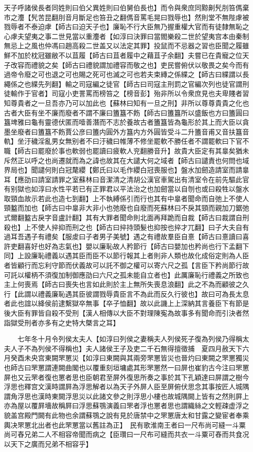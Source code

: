 天子呼諸侯長者同姓則曰伯父異姓則曰伯舅伯長也】而令與衆庶同黥劓髠刖笞傌棄市之灋【髠苦昆翻刖音月斷足也笞丑之翻傌音罵毛晃曰戮辱也】然則堂不無陛虖被戮辱者不泰迫虖【師古曰迫天子也】廉恥不行大臣無乃握重權大官而有徒隸無恥之心虖夫望夷之事二世見當以重灋者【如淳曰決罪曰當閻樂殺二世於望夷宫本由秦制無忌上之風也仲馮曰趙高殺二世盖又以法定其罪】投鼠而不忌器之習也臣聞之履雖鮮不加於枕冠雖敝不以苴履【師古曰苴者履中之藉苴子余翻】夫嘗已在貴寵之位天子改容而禮貌之矣【師古曰禮貌謂加禮容而敬之也】吏民嘗俯伏以敬畏之矣今而有過帝令廢之可也退之可也賜之死可也滅之可也若夫束縳之係緤之【師古曰緤謂以長繩係之也緤先列翻】輸之司寇編之徒官【師古曰司寇主刑罰之官編次列也徒官謂刑徒輸作于官者】司寇小吏詈罵而榜笞之【榜音彭】殆非所以令衆庶見也夫卑賤者習知尊貴者之一旦吾亦乃可以加此也【蘇林曰知有一旦之刑】非所以尊尊貴貴之化也古者大臣有坐不廉而廢者不謂不廉曰簠簋不飭【師古曰簠簋所以盛飯也方曰簠圓曰簋埤雅曰龜有靈德伏匿而噎善潛而不志於養故古者簠簋皆為龜形於其上而大臣以貪墨坐廢者曰簠簋不飭賈公彦曰簠内圓外方簋内方外圓皆受斗二升簠音甫又音扶簋音軌】坐汙穢淫亂男女無别者不曰汙穢曰帷薄不修坐罷軟不勝任者不謂罷軟曰下官不職【師古曰罷廢於事也軟弱也罷讀曰疲軟人兖翻勝音升】故貴大臣定有其辠矣猶未斥然正以呼之也尚遷就而為之諱也故其在大譴大何之域者【師古曰譴責也何問也域界局也】聞譴何則白冠氂纓【鄭氏曰以毛作纓白冠喪服也】盤水加劒造請室而請辠耳【應劭曰請室請罪之室蘇林曰音潔清之清胡公漢官車駕出有清室令在前先驅此官有别獄也如淳曰水性平若已有正罪君以平法治之也加劒當以自刎也或曰殺牲以盤水取頸血故示若此也造七到翻】上不執縛係引而行也其有中辠者聞命而自弛上不使人頸盭而加也【師古曰中辠非大非小也弛廢也自廢而死蘇林曰不戾其頸而親加刀鋸弛式爾翻盭古戾字音盧計翻】其有大罪者聞命則北面再拜跪而自裁【師古曰裁謂自刑殺也】上不使人捽抑而刑之也【師古曰捽持頭髮也抑按也捽才兀翻】曰子大夫自有過耳吾遇子有禮矣【服䖍曰子者男子美號】遇之有禮故羣臣自憙【師古曰憙讀曰喜許吏翻喜好也好為志氣也】嬰以廉恥故人矜節行【師古曰嬰加也矜尚也行下孟翻下同】上設廉恥禮義以遇其臣而臣不以節行報其上者則非人類也故化成俗定則為人臣者皆顧行而忘利守節而伏義故可以託不御之權可以寄六尺之孤【言臣下矜尚節行故可託以權柄不須復加制御應劭曰六尺之孤未能自立者也】此厲廉恥行禮義之所致也主上何喪焉【師古曰喪失也言如此則於主上無所失喪息浪翻】此之不為而顧彼之久行【此謂以禮義廉恥遇其臣彼謂戮辱貴臣言不為此而反久行彼也】故曰可為長太息者此也誼以絳侯前逮繫獄卒無事【卒子恤翻】故以此譏上上深納其言養臣下有節是後大臣有罪皆自殺不受刑【漢人相傳以大臣不對理陳寃為故事多有聞命而引決者然詣獄受刑者亦多有之史特大槩言之耳】

　　七年冬十月令列侯太夫人【如淳曰列侯之妻稱夫人列侯死子復為列侯乃得稱太夫人子不為列侯不得稱也】夫人諸侯王子及吏二千石無得擅徵捕　夏四月赦天下六月癸酉未央宫東闕罘罳災【如淳曰東闕與其兩旁罘罳皆災也晉灼曰東闕之罘罳獨災也師古曰罘罳謂連闕曲閣也以覆重刻垣墉處其形罘罳然一曰屏也崔豹古今注曰罘罳屏也又云罘者復也罳者思也臣朝君至屏外復思所奏之事於其下孔穎達曰屏謂之樹今浮思也釋宫文漢時謂屛為浮思解者以為天子外屏人臣至屏俯伏思念其事按匠人城隅謂角浮思也漢時東闕浮思災以此諸文參之則浮思小樓也故城隅闕上皆有之然則屛上亦為屋以覆屛墻故稱屛曰浮思蘇鶚演義曰罘者浮也罳者思也謂織絲之文輕疎虚浮之貌盖宫殿門闕有此物也余謂蘇鶚之說有見於唐禁中之罘罳唐太和甘露之變宦者奉乘輿决罘罳北出者也此罘罳當以舊註為正】　民有歌淮南王者曰一尺布尚可縫一斗粟尚可舂兄弟二人不相容帝聞而病之【臣瓚曰一尺布可縫而共衣一斗粟可舂而共食况以天下之廣而兄弟不相容乎】

